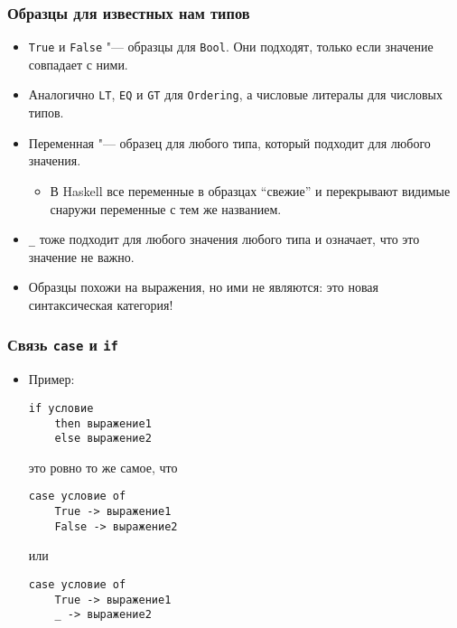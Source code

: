\documentclass[10pt]{beamer}
\begin{document}
\begin{frame}[fragile]
  \frametitle{Образцы для известных нам типов}
  \begin{itemize}
    \item \lstinline|True| и \lstinline|False| "--- образцы для \lstinline|Bool|. Они подходят, только если значение совпадает с ними.
    \item Аналогично \lstinline|LT|, \lstinline|EQ| и \lstinline|GT| для \lstinline|Ordering|, а числовые литералы для числовых типов.
    \item Переменная "--- образец для любого типа, который подходит для любого значения.
          \begin{itemize}
            \item В Haskell все переменные в образцах \enquote{свежие} и перекрывают видимые снаружи переменные с тем же названием.
          \end{itemize}
    \item \lstinline|_| тоже подходит для любого значения любого типа и означает, что это значение не важно.
    \item Образцы похожи на выражения, но ими не являются: это новая синтаксическая категория!
  \end{itemize}
\end{frame}

\begin{frame}[fragile]
  \frametitle{Связь \lstinline[basicstyle=\ttfamily]|case| и \lstinline[basicstyle=\ttfamily]|if|}
  \begin{itemize}
    \item Пример:
          \begin{lstlisting}
if условие 
    then выражение1 
    else выражение2
\end{lstlisting}
          это ровно то же самое, что
          \begin{lstlisting}
case условие of
    True -> выражение1 
    False -> выражение2
\end{lstlisting}
          или
          \begin{lstlisting}
case условие of
    True -> выражение1 
    _ -> выражение2
\end{lstlisting}
  \end{itemize}
\end{frame}
\end{document}
